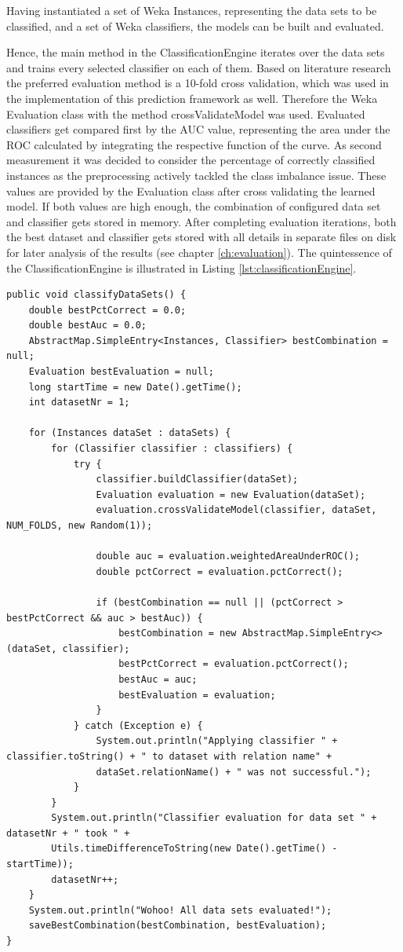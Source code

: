 Having instantiated a set of Weka Instances, representing the data sets to be classified, and a set of Weka classifiers, the models can be built and evaluated. 

Hence, the main method in the ClassificationEngine iterates over the data sets and trains every selected classifier on each of them. Based on literature research the preferred evaluation method is a 10-fold cross validation, which was used in the implementation of this prediction framework as well. Therefore the Weka Evaluation class with the method crossValidateModel was used. Evaluated classifiers get compared first by the AUC value, representing the area under the ROC calculated by integrating the respective function of the curve. As second measurement it was decided to consider the percentage of correctly classified instances as the preprocessing actively tackled the class imbalance issue. These values are provided by the Evaluation class after cross validating the learned model. If both values are high enough, the combination of configured data set and classifier gets stored in memory. After completing evaluation iterations, both the best dataset and classifier gets stored with all details in separate files on disk for later analysis of the results (see chapter \ref{ch:evaluation}). The quintessence of the ClassificationEngine is illustrated in Listing \ref{lst:classificationEngine}. 

\begin{lstlisting}[caption={Applying configured classifiers on preprocessed data sets}, label={lst:classificationEngine}]
public void classifyDataSets() {
	double bestPctCorrect = 0.0;
	double bestAuc = 0.0;
	AbstractMap.SimpleEntry<Instances, Classifier> bestCombination = null;
	Evaluation bestEvaluation = null;
	long startTime = new Date().getTime();
	int datasetNr = 1;
	
	for (Instances dataSet : dataSets) {
		for (Classifier classifier : classifiers) {
			try {
				classifier.buildClassifier(dataSet);
				Evaluation evaluation = new Evaluation(dataSet);
				evaluation.crossValidateModel(classifier, dataSet, NUM_FOLDS, new Random(1));
	
				double auc = evaluation.weightedAreaUnderROC();
				double pctCorrect = evaluation.pctCorrect();
				
				if (bestCombination == null || (pctCorrect > bestPctCorrect && auc > bestAuc)) {
					bestCombination = new AbstractMap.SimpleEntry<>(dataSet, classifier);
					bestPctCorrect = evaluation.pctCorrect();
					bestAuc = auc;
					bestEvaluation = evaluation;
				}
			} catch (Exception e) {
				System.out.println("Applying classifier " + classifier.toString() + " to dataset with relation name" +
				dataSet.relationName() + " was not successful.");
			}
		}
		System.out.println("Classifier evaluation for data set " + datasetNr + " took " +
		Utils.timeDifferenceToString(new Date().getTime() - startTime));
		datasetNr++;
	}
	System.out.println("Wohoo! All data sets evaluated!");
	saveBestCombination(bestCombination, bestEvaluation);
}
\end{lstlisting}

